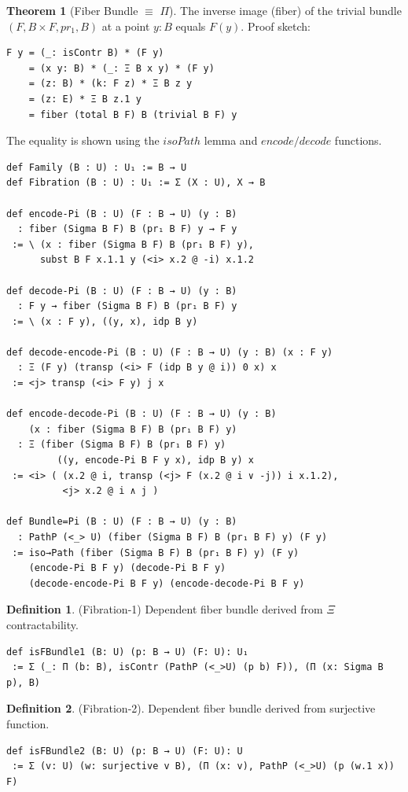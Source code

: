 \documentclass{article}
\theoremstyle{definition}
\newtheorem{definition}{Definition}
\newtheorem{theorem}{Theorem}
\begin{document}
\newpage
\begin{theorem}[Fiber Bundle $\equiv$ $\Pi$]
The inverse image (fiber) of the trivial bundle \( (F, B \times F, pr_1, B) \) at a point \( y: B \)
equals \( F(y) \). Proof sketch:
\begin{lstlisting}[mathescape=true]
F y = (_: isContr B) * (F y)
    = (x y: B) * (_: Ξ B x y) * (F y)
    = (z: B) * (k: F z) * Ξ B z y
    = (z: E) * Ξ B z.1 y
    = fiber (total B F) B (trivial B F) y
\end{lstlisting}
The equality is shown using the $isoPath$ lemma and $encode/decode$ functions.
\begin{lstlisting}[mathescape=true]
def Family (B : U) : U₁ := B → U
def Fibration (B : U) : U₁ := Σ (X : U), X → B

def encode-Pi (B : U) (F : B → U) (y : B)
  : fiber (Sigma B F) B (pr₁ B F) y → F y
 := \ (x : fiber (Sigma B F) B (pr₁ B F) y),
      subst B F x.1.1 y (<i> x.2 @ -i) x.1.2

def decode-Pi (B : U) (F : B → U) (y : B)
  : F y → fiber (Sigma B F) B (pr₁ B F) y
 := \ (x : F y), ((y, x), idp B y)

def decode-encode-Pi (B : U) (F : B → U) (y : B) (x : F y)
  : Ξ (F y) (transp (<i> F (idp B y @ i)) 0 x) x
 := <j> transp (<i> F y) j x

def encode-decode-Pi (B : U) (F : B → U) (y : B)
    (x : fiber (Sigma B F) B (pr₁ B F) y)
  : Ξ (fiber (Sigma B F) B (pr₁ B F) y)
         ((y, encode-Pi B F y x), idp B y) x
 := <i> ( (x.2 @ i, transp (<j> F (x.2 @ i ∨ -j)) i x.1.2),
          <j> x.2 @ i ∧ j )

def Bundle=Pi (B : U) (F : B → U) (y : B)
  : PathP (<_> U) (fiber (Sigma B F) B (pr₁ B F) y) (F y)
 := iso→Path (fiber (Sigma B F) B (pr₁ B F) y) (F y)
    (encode-Pi B F y) (decode-Pi B F y)
    (decode-encode-Pi B F y) (encode-decode-Pi B F y)
\end{lstlisting}
\end{theorem}

\newpage
\begin{definition} (Fibration-1) Dependent fiber bundle derived from $\Xi$ contractability.
\begin{lstlisting}
def isFBundle1 (B: U) (p: B → U) (F: U): U₁
 := Σ (_: Π (b: B), isContr (PathP (<_>U) (p b) F)), (Π (x: Sigma B p), B)
\end{lstlisting}
\end{definition}

\begin{definition} (Fibration-2). Dependent fiber bundle derived from surjective function.
\begin{lstlisting}
def isFBundle2 (B: U) (p: B → U) (F: U): U
 := Σ (v: U) (w: surjective v B), (Π (x: v), PathP (<_>U) (p (w.1 x)) F)
\end{lstlisting}
\end{definition}
\end{document}
